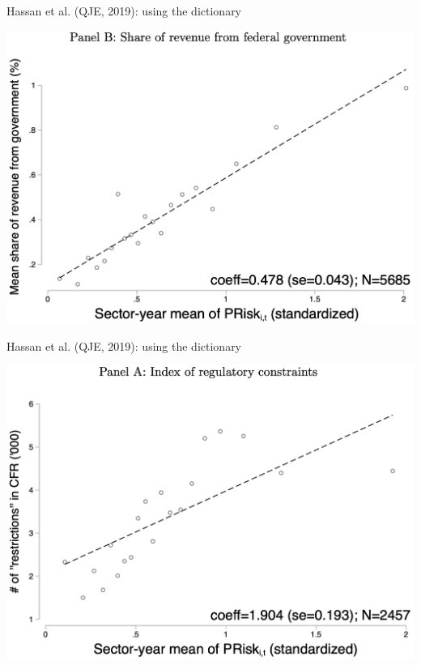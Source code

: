 \documentclass[english]{beamer}
\begin{document}
\begin{frame}{Hassan et al. (QJE, 2019): using the dictionary}
\vspace{-7pt}
\begin{center}
\includegraphics[scale=0.35]{Images/hassan_new3.png}
\end{center}
\end{frame}

\begin{frame}{Hassan et al. (QJE, 2019): using the dictionary}
\vspace{-7pt}
\begin{center}
\includegraphics[scale=0.35]{Images/hassan_new4.png}
\end{center}
\end{frame}
\end{document}
